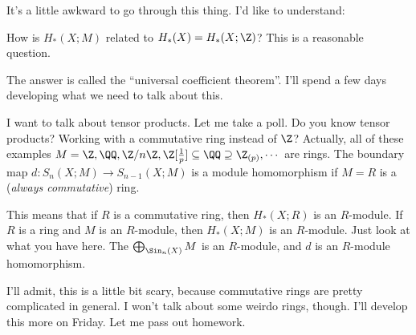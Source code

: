 It's a little awkward to go through this thing. I'd like to understand:
\begin{question}
How is $ H_\ast(X;M)$ related to $ H_\ast(X)= H_\ast(X;\Z)$? This is a reasonable question.
\end{question}
The answer is called the ``universal coefficient theorem''. I'll spend a few days developing what we need to talk about this.

I want to talk about tensor products. Let me take a poll. Do you know tensor products? Working with a commutative ring instead of $\Z$? Actually, all of these examples $M=\Z,\QQ,\Z/n\Z,\Z[\frac{1}{p}]\subseteq\QQ\supseteq\Z_{(p)},\cdots$ are rings. The boundary map $d:S_n(X;M)\to S_{n-1}(X;M)$ is a module homomorphism if $M=R$ is a (\emph{always commutative}) ring.

This means that if $R$ is a commutative ring, then $ H_\ast(X;R)$ is an $R$-module. If $R$ is a ring and $M$ is an $R$-module, then $ H_\ast(X;M)$ is an $R$-module. Just look at what you have here. The $\bigoplus_{\Sin_n(X)}M$ is an $R$-module, and $d$ is an $R$-module homomorphism.

I'll admit, this is a little bit scary, because commutative rings are pretty complicated in general. I won't talk about some weirdo rings, though. I'll develop this more on Friday. Let me pass out homework.
